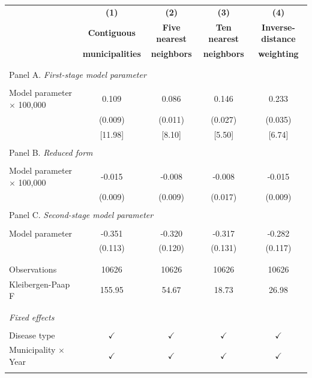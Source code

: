 \begin{tabular}{l c c c c}
\toprule[1.5pt]
\multicolumn{1}{c}{\textbf{}} & \textbf{(1)} & \textbf{(2)} & \textbf{(3)} & \textbf{(4)}   \\
\multicolumn{1}{c}{\textbf{}} & \textbf{Contiguous} & \textbf{Five nearest} & \textbf{Ten nearest} & \textbf{Inverse-distance}   \\
\multicolumn{1}{c}{\textbf{}} & \textbf{municipalities} & \textbf{neighbors} & \textbf{neighbors} & \textbf{weighting}   \\ \hline \\
\\
\multicolumn{5}{l}{Panel A. \textit{First-stage model parameter}}\\
\\
Model parameter $\times$ 100,000   & 0.109 & 0.086 & 0.146 & 0.233  \\
& (0.009) & (0.011)  & (0.027) & (0.035)  \\
& [11.98] & [8.10]  & [5.50] & [6.74]  \\
\\
\multicolumn{5}{l}{Panel B. \textit{Reduced form}}\\
\\
Model parameter $\times$ 100,000   & -0.015 & -0.008 & -0.008 & -0.015  \\
& (0.009) & (0.009)  & (0.017) & (0.009)  \\
\\
\multicolumn{5}{l}{Panel C. \textit{Second-stage model parameter}}\\
\\
Model parameter & -0.351 & -0.320 & -0.317 & -0.282  \\
& (0.113) & (0.120)  & (0.131) & (0.117)  \\
\\
\midrule[1 pt]
\\
Observations & 10626 & 10626 &  10626 & 10626 \\
Kleibergen-Paap F & 155.95 & 54.67 & 18.73 & 26.98 \\
\\
\midrule[1 pt]
\\
\multicolumn{5}{l}{\textit{Fixed effects}} \\
\\
Disease type & $\checkmark$ & $\checkmark$ & $\checkmark$  & $\checkmark$ \\
Municipality $\times$ Year & $\checkmark$   &  $\checkmark$ & $\checkmark$ & $\checkmark$ \\
\\
\midrule[1 pt]
\end{tabular}
